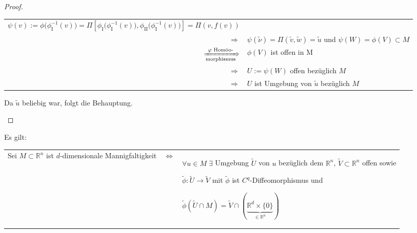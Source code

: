 \begin{proof}
\begin{itemize}
\begin{tabularx}{\linewidth}{r@{\ }X}
			\vspace*{1mm}
			\hspace*{1em} $\psi(v) := \phi\big(\phi_{\text{I}}^{-1}(v)\big) = \Pi\left[\phi_{\text{I}}\big(\phi_{\text{I}}^{-1}(v)\big),\phi_{\text{II}}\big(\phi_{\text{I}}^{-1}(v)\big)\right] = \Pi(v, f(v))$
			 \\
			$\Rightarrow$ & $\psi(\tilde{\nu}) = \Pi(\tilde{v}, \tilde{w}) = \tilde{u}$ und $\psi(W) = \phi(V)\subset M$ \\
			$\xRightarrow[\text{morphismus}]{\phi \text{ Homöo-}}$ & $\phi(V)$ ist offen in M \\
			$\Rightarrow$ & $U := \psi(W)$ offen bezüglich $M$ \\
			$\Rightarrow$ &$U$ ist Umgebung von $\tilde{u}$ bezüglich $M$
		\end{tabularx}
		Da $\tilde{u}$ beliebig war, folgt die Behauptung.
	\end{itemize}
\end{proof}

\begin{proposition}
	Es gilt:
	
	\begin{tabularx}{\linewidth}{p{5cm}@{\ }c@{\ }X}
	Sei $M\subset \mathbb{R}^n$ ist $d$-dimensionale Mannigfaltigkeit & $\Leftrightarrow$ & $\forall u\in M\;\exists$ Umgebung $\tilde{U}$ von $u$ bezüglich dem $\mathbb{R}^n$, $\tilde{V}\subset\mathbb{R}^n$ offen sowie
	
	$\tilde{\phi}\!: \tilde{U}\to \tilde{V}$ mit $\tilde{\phi}$ ist $C^q$-Diffeomorphismus und
	
	\vspace*{1mm}
	\hspace*{1em}$\tilde{\phi}(\tilde{U}\cap M) = \tilde{V} \cap (\underbrace{\mathbb{R}^d \times \{ 0 \}}_{\in \mathbb{R}^n})$
	\end{tabularx}
\end{proposition}